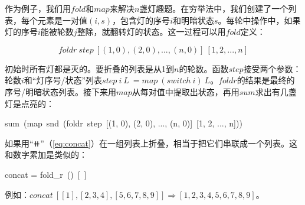 \documentclass[b5paper]{ctexart}
\begin{document}
作为例子，我们用$fold$和$map$来解决$n$盏灯趣题。在穷举法中，我们创建了一个列表，每个元素是一对值$(i, s)$，包含灯的序号$i$和明暗状态$s$。每轮中操作中，如果灯的序号$i$能被轮数$j$整除，就翻转灯的状态。这一过程可以用$fold$定义：

\[
foldr\ step\ [(1, 0), (2, 0), ..., (n, 0)]\ [1, 2, ..., n]
\]

初始时所有灯都是灭的。要折叠的列表是从1到$n$的轮数。函数$step$接受两个参数：轮数$i$和“灯序号/状态”列表$step\ i\ L\ = map\ (switch\ i)\ L$。$foldr$的结果是最终的序号/明暗状态列表。接下来用$map$从每对值中提取出状态，再用$sum$求出有几盏灯是点亮的：

\be
sum\ (map\ snd\ (foldr\ step\ [(1, 0), (2, 0), ..., (n, 0)]\ [1, 2, ..., n]))
\ee

如果用“$\doubleplus$”（\cref{eq:concat}）在一组列表上折叠，相当于把它们串联成一个列表。这和数字累加是类似的：

\be
concat = fold_r\ (\doubleplus)\ [\ ]
\ee

例如：$concat\ [[1], [2, 3, 4], [5, 6, 7, 8, 9]] \Rightarrow [1, 2, 3, 4, 5, 6, 7, 8, 9]$。

\begin{Exercise}\label{ex:list-fold}
\end{Exercise}
\end{document}
